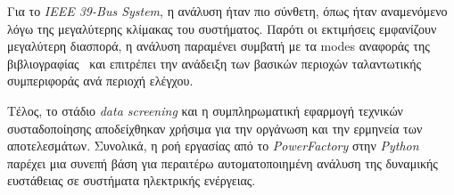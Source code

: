 \documentclass[conference]{IEEEtran}
\begin{document}
Για το \textit{IEEE 39-Bus System}, η ανάλυση ήταν πιο σύνθετη, όπως ήταν αναμενόμενο λόγω της μεγαλύτερης κλίμακας του συστήματος. Παρότι οι εκτιμήσεις εμφανίζουν μεγαλύτερη διασπορά, η ανάλυση παραμένει συμβατή με τα modes αναφοράς της βιβλιογραφίας~\cite{sarkar2024drga} και επιτρέπει την ανάδειξη των βασικών περιοχών ταλαντωτικής συμπεριφοράς ανά περιοχή ελέγχου.

Τέλος, το στάδιο \textit{data screening} και η συμπληρωματική εφαρμογή τεχνικών συσταδοποίησης αποδείχθηκαν χρήσιμα για την οργάνωση και την ερμηνεία των αποτελεσμάτων. Συνολικά, η ροή εργασίας από το \textit{PowerFactory} στην \textit{Python} παρέχει μια συνεπή βάση για περαιτέρω αυτοματοποιημένη ανάλυση της δυναμικής ευστάθειας σε συστήματα ηλεκτρικής ενέργειας.

\FloatBarrier


\end{document}
